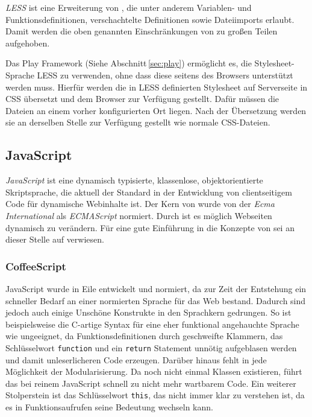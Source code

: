 \textit{LESS} ist eine Erweiterung von , die unter anderem  Variablen- und
Funktionsdefinitionen, verschachtelte Definitionen sowie  Dateiimports erlaubt. Damit werden die
oben genannten Einschränkungen von  zu großen Teilen aufgehoben.

Das Play Framework (Siehe Abschnitt\,\ref{sec:play}) ermöglicht es, die Stylesheet-Sprache LESS zu
verwenden, ohne dass diese seitens des Browsers unterstützt werden muss. Hierfür werden die in  LESS
definierten Stylesheet auf Serverseite in CSS übersetzt  und dem Browser zur Verfügung gestellt.
Dafür müssen die Dateien an einem vorher konfigurierten Ort liegen. Nach der Übersetzung werden sie
an derselben Stelle zur Verfügung gestellt wie normale CSS-Dateien.

\subsection{JavaScript}

\textit{JavaScript} ist eine dynamisch typisierte, klassenlose, objektorientierte Skriptsprache, die
aktuell der Standard in der Entwicklung von clientseitigem Code für dynamische Webinhalte ist. Der
Kern von  wurde von der \textit{Ecma International} als \textit{ECMAScript} normiert. Durch
 ist es möglich Webseiten dynamisch zu verändern. Für eine gute Einführung in die Konzepte
von  sei an dieser Stelle auf \cite{js} verwiesen.

\subsubsection{CoffeeScript}
\label{sec:coffeescript}

JavaScript wurde in Eile entwickelt und normiert, da zur Zeit der Entstehung ein schneller Bedarf an
einer normierten Sprache für das Web bestand. Dadurch sind jedoch auch einige Unschöne Konstrukte in
den Sprachkern gedrungen. So ist beispielsweise die C-artige Syntax für eine eher funktional
angehauchte Sprache wie  ungeeignet, da Funktionsdefinitionen durch geschweifte Klammern,
das Schlüsselwort \texttt{function} und ein \texttt{return} Statement unnötig aufgeblasen werden und
damit unleserlicheren Code erzeugen. Darüber hinaus fehlt in  jede Möglichkeit der
Modularisierung. Da noch nicht einmal Klassen existieren, führt das bei reinem JavaScript schnell zu
nicht mehr wartbarem Code. Ein weiterer Stolperstein ist das Schlüsselwort \texttt{this}, das nicht
immer klar zu verstehen ist, da es in Funktionsaufrufen seine Bedeutung wechseln kann.

